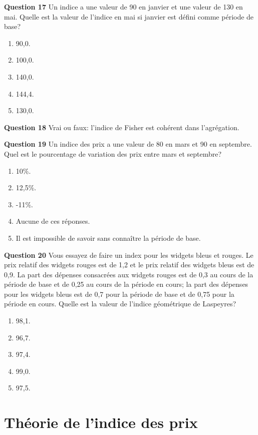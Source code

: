 \documentclass[]{article}
\begin{document}
\textbf{Question 17} Un indice a une valeur de 90 en janvier et une valeur de 130 en mai. Quelle est la valeur de l'indice en mai si janvier est défini comme période de base?

\begin{enumerate}
\def\labelenumi{\alph{enumi})}
\item
  90,0.
\item
  100,0.
\item
  140,0.
\item
  144,4.
\item
  130,0.
\end{enumerate}

\textbf{Question 18} Vrai ou faux: l'indice de Fisher est cohérent dans l'agrégation.

\textbf{Question 19} Un indice des prix a une valeur de 80 en mars et 90 en septembre. Quel est le pourcentage de variation des prix entre mars et septembre?

\begin{enumerate}
\def\labelenumi{\alph{enumi})}
\item
  10\%.
\item
  12,5\%.
\item
  -11\%.
\item
  Aucune de ces réponses.
\item
  Il est impossible de savoir sans connaître la période de base.
\end{enumerate}

\textbf{Question 20} Vous essayez de faire un index pour les widgets bleus et rouges. Le prix relatif des widgets rouges est de 1,2 et le prix relatif des widgets bleus est de 0,9. La part des dépenses consacrées aux widgets rouges est de 0,3 au cours de la période de base et de 0,25 au cours de la période en cours; la part des dépenses pour les widgets bleus est de 0,7 pour la période de base et de 0,75 pour la période en cours. Quelle est la valeur de l'indice géométrique de Laspeyres?

\begin{enumerate}
\def\labelenumi{\alph{enumi})}
\item
  98,1.
\item
  96,7.
\item
  97,4.
\item
  99,0.
\item
  97,5.
\end{enumerate}

\hypertarget{part-thuxe9orie-de-lindice-des-prix}{%
\part{Théorie de l'indice des prix}\label{part-thuxe9orie-de-lindice-des-prix}}
\end{document}
